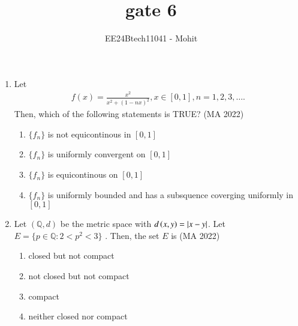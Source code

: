 \documentclass[journal,12pt,onecolumn]{IEEEtran}
\theoremstyle{remark}
\begin{document}
\title{gate 6}
\author{EE24Btech11041 - Mohit}
\maketitle
\renewcommand{\thefigure}{\theenumi}
\renewcommand{\thetable}{\theenumi}


\begin{enumerate}
\item Let \\
\begin{align}
f(x)=\frac{x^2}{x^2+(1-nx)^2}, x \in [0,1], n = 1,2,3,\dots  .
\end{align}
Then, which of the following statements is TRUE?
\hfill{(MA 2022)}
\begin{enumerate}
\item $\{f_n\}$ is not equicontinous in $[0,1]$
\item $\{f_n\}$ is uniformly convergent on $[0,1]$
\item $\{f_n\}$ is equicontinous on $[0,1]$
\item $\{f_n\}$ is uniformly bounded and has a subsquence coverging uniformly in $[0,1]$
\end{enumerate}
\item Let $(\mathbb{Q},d)$ be the metric space with $d\left(x,y\right) = \left\vert x-y\right\vert$. Let $E = \{p \in \mathbb{Q} : 2 < p^2 < 3 \}$ . Then, the set $E$ is 
\hfill{(MA 2022)}
\begin{enumerate}
\item closed but not compact
\item not closed but not compact
\item compact
\item neither closed nor compact
\end{enumerate}


\end{enumerate}
\end{document}
